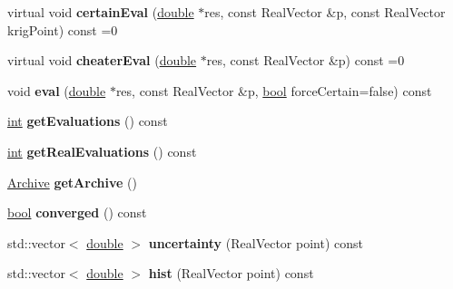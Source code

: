 \begin{DoxyCompactItemize}
\item 
virtual void {\bfseries certain\+Eval} (\hyperlink{classdouble}{double} $\ast$res, const Real\+Vector \&p, const Real\+Vector krig\+Point) const =0\hypertarget{classUncertainFunc_ad5dea5bcd70ffd70a59a8af6447d3abc}{}\label{classUncertainFunc_ad5dea5bcd70ffd70a59a8af6447d3abc}

\item 
virtual void {\bfseries cheater\+Eval} (\hyperlink{classdouble}{double} $\ast$res, const Real\+Vector \&p) const =0\hypertarget{classUncertainFunc_a078c9a70900f5915c726e6c6e8c079df}{}\label{classUncertainFunc_a078c9a70900f5915c726e6c6e8c079df}

\item 
void {\bfseries eval} (\hyperlink{classdouble}{double} $\ast$res, const Real\+Vector \&p, \hyperlink{classbool}{bool} force\+Certain=false) const \hypertarget{classUncertainFunc_a15bea4023bd717aa81a986e8d7b144bf}{}\label{classUncertainFunc_a15bea4023bd717aa81a986e8d7b144bf}

\item 
\hyperlink{classint}{int} {\bfseries get\+Evaluations} () const \hypertarget{classUncertainFunc_a1c22d63650a493bed1de282ffda1fd69}{}\label{classUncertainFunc_a1c22d63650a493bed1de282ffda1fd69}

\item 
\hyperlink{classint}{int} {\bfseries get\+Real\+Evaluations} () const \hypertarget{classUncertainFunc_ae013bfe78f3585678e83f5587d63d427}{}\label{classUncertainFunc_ae013bfe78f3585678e83f5587d63d427}

\item 
\hyperlink{classArchive}{Archive} {\bfseries get\+Archive} ()\hypertarget{classUncertainFunc_a3fb8310f6ad93e6b333829f74023d13f}{}\label{classUncertainFunc_a3fb8310f6ad93e6b333829f74023d13f}

\item 
\hyperlink{classbool}{bool} {\bfseries converged} () const \hypertarget{classUncertainFunc_ad1ed4e1bbd3cd2b8b03c96c157cb9774}{}\label{classUncertainFunc_ad1ed4e1bbd3cd2b8b03c96c157cb9774}

\item 
std\+::vector$<$ \hyperlink{classdouble}{double} $>$ {\bfseries uncertainty} (Real\+Vector point) const \hypertarget{classUncertainFunc_a73a39a0c557b40e0e64218666f06ed9e}{}\label{classUncertainFunc_a73a39a0c557b40e0e64218666f06ed9e}

\item 
std\+::vector$<$ \hyperlink{classdouble}{double} $>$ {\bfseries hist} (Real\+Vector point) const \hypertarget{classUncertainFunc_aa5969910ed2ef6d058755b761384c491}{}\label{classUncertainFunc_aa5969910ed2ef6d058755b761384c491}


\end{DoxyCompactItemize}
